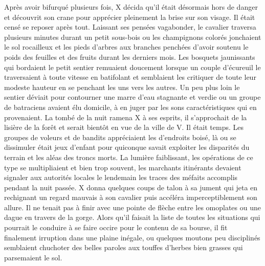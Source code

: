 \documentclass{book}
\begin{document}
Après avoir bifurqué plusieurs fois, X décida qu'il était désormais hors de danger et découvrit son crane pour apprécier pleinement la brise sur son visage. Il était censé se reposer après tout. Laissant ses pensées vagabonder, le cavalier traversa plusieurs minutes durant un petit sous-bois ou les champignons colorés jonchaient le sol rocailleux et les pieds d'arbres aux branches penchées d'avoir soutenu le poids des feuilles et des fruits durant les derniers mois. Les bosquets jaunissants qui bordaient le petit sentier remuaient doucement lorsque un couple d'écureuil le traversaient à toute vitesse en batifolant et semblaient les critiquer de toute leur modeste hauteur en se penchant les uns vers les autres. Un peu plus loin le sentier déviait pour contourner une marre d'eau stagnante et verdie ou un groupe de batraciens avaient élu domicile, à en juger par les sons caractéristiques qui en provenaient. La tombé de la nuit ramena X à ses esprits, il s'approchait de la lisière de la forêt et serait bientôt en vue de la ville de V. Il était temps.
Les groupes de voleurs et de bandits appréciaient les d'endroits boisé, là ou se dissimuler était jeux d'enfant pour quiconque savait exploiter les disparités du terrain et les aléas des troncs morts. La lumière faiblissant, les opérations de ce type se multipliaient et bien trop souvent, les marchants itinérants devaient signaler aux autorités locales le lendemain les traces des méfaits accomplis pendant la nuit passée. \newline
X donna quelques coups de talon à sa jument qui jeta en rechignant un regard mauvais à son cavalier puis accéléra imperceptiblement son allure.
Il ne tenait pas à finir avec une pointe de flèche entre les omoplates ou une dague en travers de la gorge.
Alors qu'il faisait la liste de toutes les situations qui pourrait le conduire à se faire occire pour le contenu de sa bourse, il fit finalement irruption dans une plaine inégale, ou quelques moutons peu disciplinés semblaient chuchoter des belles paroles aux touffes d'herbes bien grasses qui parsemaient le sol. \newline
\end{document}
